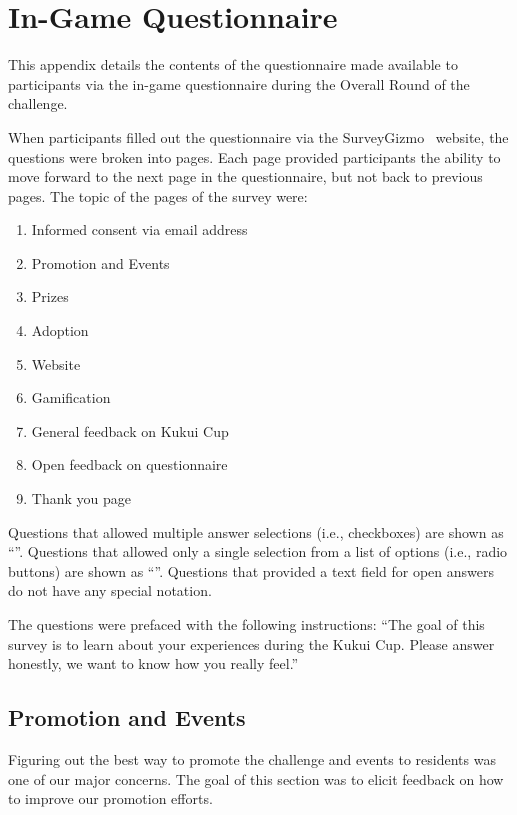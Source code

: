 \chapter{In-Game Questionnaire}
\label{app:in-game-questionnaire}

This appendix details the contents of the questionnaire made available to participants via the in-game questionnaire during the Overall Round of the challenge.

When participants filled out the questionnaire via the SurveyGizmo~\cite{surveygizmo} website, the questions were broken into pages. Each page provided participants the ability to move forward to the next page in the questionnaire, but not back to previous pages. The topic of the pages of the survey were:

\begin{enumerate}
	\item Informed consent via email address
	\item Promotion and Events
	\item Prizes
	\item Adoption
	\item Website
	\item Gamification
	\item General feedback on Kukui Cup
	\item Open feedback on questionnaire
	\item Thank you page
\end{enumerate}

Questions that allowed multiple answer selections (i.e., checkboxes) are shown as ``\Square''. Questions that allowed only a single selection from a list of options (i.e., radio buttons) are shown as ``\Circle''. Questions that provided a text field for open answers do not have any special notation.

The questions were prefaced with the following instructions: ``The goal of this survey is to learn about your experiences during the Kukui Cup. Please answer honestly, we want to know how you really feel.''

\section{Promotion and Events}

Figuring out the best way to promote the challenge and events to residents was one of our major concerns. The goal of this section was to elicit feedback on how to improve our promotion efforts.

